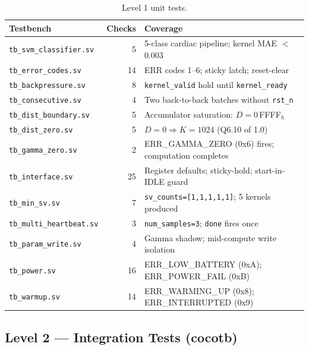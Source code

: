 \documentclass[11pt]{article}
\begin{document}
\begin{table}[H]
  \centering
  \caption{Level 1 unit tests.}
  \label{tab:l1}
  \small
  \begin{tabular}{lrl}
    \toprule
    Testbench & Checks & Coverage \\
    \midrule
    \texttt{tb\_svm\_classifier.sv}  & 5  & 5-class cardiac pipeline; kernel MAE $<$ 0.003 \\
    \texttt{tb\_error\_codes.sv}     & 14 & ERR codes 1--6; sticky latch; reset-clear \\
    \texttt{tb\_backpressure.sv}     & 8  & \texttt{kernel\_valid} hold until \texttt{kernel\_ready} \\
    \texttt{tb\_consecutive.sv}      & 4  & Two back-to-back batches without \texttt{rst\_n} \\
    \texttt{tb\_dist\_boundary.sv}   & 5  & Accumulator saturation: $D = 0$\,FFFF$_h$ \\
    \texttt{tb\_dist\_zero.sv}       & 5  & $D=0 \Rightarrow K=1024$ (Q6.10 of 1.0) \\
    \texttt{tb\_gamma\_zero.sv}      & 2  & ERR\_GAMMA\_ZERO (0x6) fires; computation completes \\
    \texttt{tb\_interface.sv}        & 25 & Register defaults; sticky-hold; start-in-IDLE guard \\
    \texttt{tb\_min\_sv.sv}          & 7  & \texttt{sv\_counts=[1,1,1,1,1]}; 5 kernels produced \\
    \texttt{tb\_multi\_heartbeat.sv} & 3  & \texttt{num\_samples=3}; \texttt{done} fires once \\
    \texttt{tb\_param\_write.sv}     & 4  & Gamma shadow; mid-compute write isolation \\
    \texttt{tb\_power.sv}            & 16 & ERR\_LOW\_BATTERY (0xA); ERR\_POWER\_FAIL (0xB) \\
    \texttt{tb\_warmup.sv}           & 14 & ERR\_WARMING\_UP (0x8); ERR\_INTERRUPTED (0x9) \\
    \bottomrule
  \end{tabular}
\end{table}

\subsection{Level 2 --- Integration Tests (cocotb)}
\end{document}
